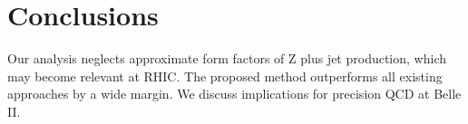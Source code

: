 \section{Conclusions}\label{sec:conclusions}

Our analysis neglects approximate form factors of Z plus jet production,
which may become relevant at RHIC. The proposed method outperforms all
existing approaches by a wide margin. We discuss implications for
precision QCD at Belle II.

